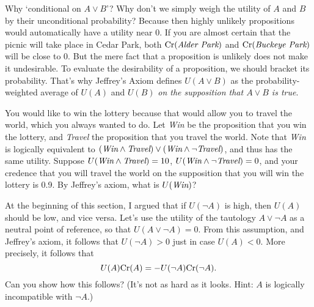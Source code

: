 Why `conditional on $A \lor B$'? Why don't we simply weigh the utility
of $A$ and $B$ by their unconditional probability? Because then highly
unlikely propositions would automatically have a utility near 0. If
you are almost certain that the picnic will take place in Cedar Park,
both $\text{Cr}(\emph{Alder Park})$ and $\text{Cr}(\emph{Buckeye Park})$ will be
close to 0. But the mere fact that a proposition is unlikely does not
make it undesirable. To evaluate the desirability of a proposition, we
should bracket its probability. That's why Jeffrey's Axiom defines
$U(A \lor B)$ as the probability-weighted average of $U(A)$ and $U(B)$ \emph{on
the supposition that $A \lor B$ is true}.

\begin{exercise2}
  You would like to win the lottery because that would allow you to
  travel the world, which you always wanted to do. Let \emph{Win} be
  the proposition that you win the lottery, and \emph{Travel} the
  proposition that you travel the world. Note that \emph{Win} is
  logically equivalent to $(\emph{Win} \land \emph{Travel}) \lor
  (\emph{Win} \land \neg \emph{Travel})$, and thus has the same
  utility. Suppose $U(\emph{Win} \land \emph{Travel}) = 10$,
  $U(\emph{Win} \land \neg \emph{Travel}) = 0$, and your credence that
  you will travel the world on the supposition that you will win the
  lottery is 0.9. By Jeffrey's axiom, what is $U(\emph{Win})$?
\end{exercise2}

\begin{exercise2}
  At the beginning of this section, I argued that if $U(\neg A)$ is
  high, then $U(A)$ should be low, and vice versa. Let's use the
  utility of the tautology $A \lor \neg A$ as a neutral point of
  reference, so that $U(A \lor \neg A) = 0$. From this assumption, and
  Jeffrey's axiom, it follows that $U(\neg A) > 0$ just in case $U(A)
  < 0$. More precisely, it follows that
  \[
  U(A)\text{Cr}(A) = - U(\neg A)\text{Cr}(\neg A).
  \]
  Can you show how this follows? (It's not as hard as it looks. Hint:
  $A$ is logically incompatible with $\neg A$.)
\end{exercise2}

